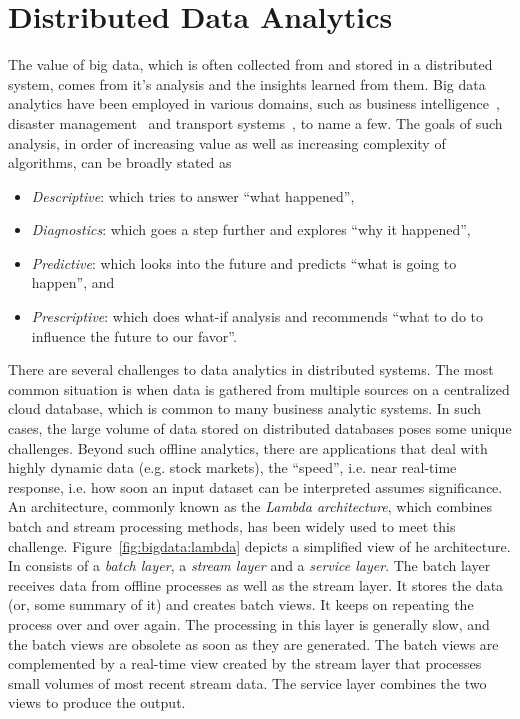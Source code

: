 \section{Distributed Data Analytics}
\label{sec:bigdata:analytics}

The value of big data, which is often collected from and stored in a distributed system, comes from it's analysis and the insights
learned from them. Big data analytics have been employed in various domains, such as business intelligence~\citep{LiuX:2014}, disaster
management~\citep{Wang:2016} and transport systems~\citep{Ghofrani:2018}, to name a few. The goals of such analysis, in order of increasing
value as well as increasing complexity of algorithms, can be broadly stated as 

\begin{itemize}
	\item {\em Descriptive}: which tries to answer ``what happened'',
	\item {\em Diagnostics}: which goes a step further and explores ``why it happened'',
	\item {\em Predictive}: which looks into the future and predicts ``what is going to happen'', and
	\item {\em Prescriptive}: which does what-if analysis and recommends ``what to do to influence the future to our favor''.
\end{itemize}

 
There are several challenges to data analytics in distributed systems. The most common situation is when data is gathered from 
multiple sources on a centralized cloud database, which is common to many business analytic systems. In such cases, the large 
volume of data stored on distributed databases poses some unique challenges. Beyond such offline analytics, there are applications 
that deal with highly dynamic data (e.g. stock markets), the ``speed'', i.e. near real-time response, i.e. how soon an input dataset 
can be interpreted assumes significance. An architecture, commonly known as the {\em Lambda architecture}, which combines batch
and stream processing methods, has been widely used to meet this challenge.  Figure~\ref{fig:bigdata:lambda} depicts a simplified 
view of he architecture. In consists of a {\em batch layer}, a {\em stream layer} and a {\em service layer}. The batch layer 
receives data from offline processes as well as the stream layer. It stores the data (or, some summary of it) and creates batch
views. It keeps on repeating the process over and over again. The processing in this layer is generally slow, and 
the batch views are obsolete as soon as they are generated. The batch views are complemented by a real-time view created by the
stream layer that processes small volumes of most recent stream data. The service layer combines the two views to produce the 
output.

